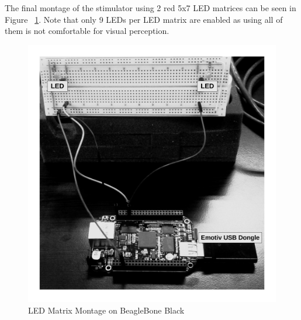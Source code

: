 \documentclass[12pt]{article}
\numberwithin{equation}{section}
\numberwithin{figure}{section}
\numberwithin{table}{section}
\begin{document}
\par{
    The final montage of the stimulator using 2 red 5x7 LED matrices can be seen in Figure ~\ref{fig:bbb_ssvep}.
    Note that only 9 LEDs per LED matrix are enabled as using all of them is not comfortable for visual perception.
    \begin{figure}[ht]
    \centering
    \includegraphics[scale=0.30]{images/bbb_ssvep}
    \caption{LED Matrix Montage on BeagleBone Black}
    \label{fig:bbb_ssvep}
    \end{figure}
}

\newpage
\end{document}
